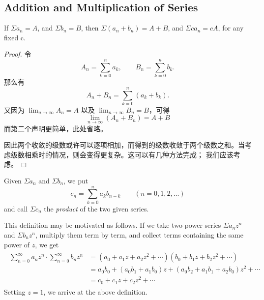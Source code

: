 \documentclass[../poma-notes.tex]{subfiles}
\begin{document}
\subsection*{Addition and Multiplication of Series}

\begin{theorem}
  If $\Sigma a_n = A$, and $\Sigma b_n = B$, then $\Sigma(a_n + b_n) = A + B$, and $\Sigma c a_n = c A$,
  for any fixed c.
\end{theorem}

\begin{proof}
  令
  \[
    A_n = \sum_{k=0}^{n} a_k, \qquad B_n = \sum_{k=0}^{n} b_k.
  \]
  那么有
  \[
    A_n + B_n = \sum_{k=0}^{n}(a_k + b_k).
  \]
  又因为 $\lim_{n\to\infty} A_n = A$ 以及 $\lim_{n\to\infty} B_n = B$，可得
  \[
    \lim_{n\to\infty} (A_n + B_n) = A + B
  \]
  而第二个声明更简单，此处省略。

  因此两个收敛的级数或许可以逐项相加，而得到的级数收敛于两个级数之和。当考虑级数相乘时的情况，则会变得更复杂。这可以有几种方法完成；
  我们应该考虑。
\end{proof}

\begin{definition}
  Given $\Sigma a_n$ and $\Sigma b_n$, we put
  \[
    c_n = \sum_{k=0}^{n} a_k b_{n-k} \qquad (n=0,1,2,\dots)
  \]
  and call $\Sigma c_n$ the \textit{product} of the two given series.

  This definition may be motivated as follows. If we take two power series $\Sigma a_n z^n$ and $\Sigma b_n z^n$,
  multiply them term by term, and collect terms containing the same power of $z$, we get
  \begin{align*}
    \begin{split}
      \sum_{n=0}^{\infty} a_n z^n \cdot \sum_{n=0}^{\infty} b_n z^n & = (a_0+a_1z+a_2z^2+\cdots)(b_0+b_1z+b_2z^2+\cdots) \\
      & = a_0b_0 + (a_0b_1 + a_1b_0)z + (a_0b_2+a_1b_1+a_2b_0)z^2 + \cdots \\
      & = c_0 + c_1z + c_2z^2 + \cdots
    \end{split}
  \end{align*}
  Setting $z=1$, we arrive at the above definition.
\end{definition}

\end{document}
